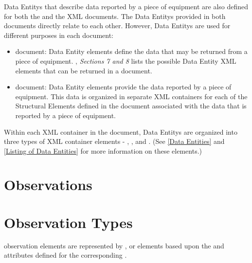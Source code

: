 \glspl{Data Entity} that describe data reported by a piece of equipment are also defined for both the  and the  \gls{XML} documents.  The \glspl{Data Entity} provided in both documents directly relate to each other.  However, \glspl{Data Entity} are used for different purposes in each document:

\begin{itemize}
\item {} document: \gls{Data Entity} elements define the data that may be returned from a piece of equipment.  , \textit{Sections 7 and 8} lists the possible \gls{Data Entity} \gls{XML} elements that can be returned in a  document.  

\item {} document: \gls{Data Entity} elements provide the data reported by a piece of equipment.  This data is organized in separate  \gls{XML} containers for each of the \glspl{Structural Element} defined in the  document associated with the data that is reported by a piece of equipment.  
\end{itemize}

Within each  \gls{XML} container in the  document, \glspl{Data Entity} are organized into three types of \gls{XML} container elements - , , and .  (See \ref{Data Entities} and \ref{Listing of Data Entities} for more information on these elements.)


\section{Observations}
\label{sec:Observations}







\section{Observation Types}
\label{sec:Observation Types}

\gls{observation} elements are represented by ,  or  elements based upon the  and  attributes defined for the corresponding .






